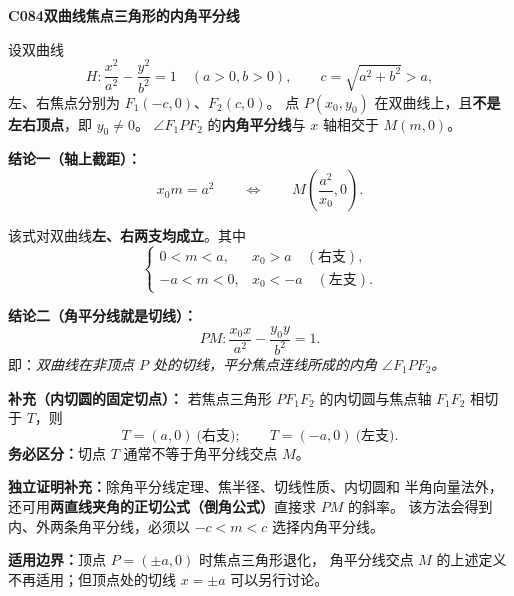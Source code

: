 \begin{statementbox}
\textbf{C084\quad 双曲线焦点三角形的内角平分线}

设双曲线
\[
H:\frac{x^2}{a^2}-\frac{y^2}{b^2}=1\quad(a>0,b>0),
\qquad c=\sqrt{a^2+b^2}>a,
\]
左、右焦点分别为 $F_1(-c,0)$、$F_2(c,0)$。
点 $P(x_0,y_0)$ 在双曲线上，且\textbf{不是左右顶点}，即 $y_0\ne0$。
$\angle F_1PF_2$ 的\textbf{内角平分线}与 $x$ 轴相交于 $M(m,0)$。

\textbf{结论一（轴上截距）：}
\[
\boxed{x_0m=a^2}\qquad\Longleftrightarrow\qquad
\boxed{M\left(\frac{a^2}{x_0},0\right)}.
\]

\end{statementbox}
\clearpage
\begin{statementbox}
该式对双曲线\textbf{左、右两支均成立}。其中
\[
\begin{cases}
0<m<a,&x_0>a\quad(\text{右支}),\\
-a<m<0,&x_0<-a\quad(\text{左支}).
\end{cases}
\]

\textbf{结论二（角平分线就是切线）：}
\[
\boxed{PM:\frac{x_0x}{a^2}-\frac{y_0y}{b^2}=1}.
\]
即：\emph{双曲线在非顶点 $P$ 处的切线，平分焦点连线所成的内角
$\angle F_1PF_2$。}

\textbf{补充（内切圆的固定切点）：}
若焦点三角形 $PF_1F_2$ 的内切圆与焦点轴 $F_1F_2$ 相切于 $T$，则
\[
\boxed{T=(a,0)\ \text{(右支)};
\qquad T=(-a,0)\ \text{(左支)}}.
\]
\textbf{务必区分：}切点 $T$ 通常不等于角平分线交点 $M$。

\textbf{独立证明补充：}除角平分线定理、焦半径、切线性质、内切圆和
半角向量法外，还可用\textbf{两直线夹角的正切公式（倒角公式）}直接求 $PM$ 的斜率。
该方法会得到内、外两条角平分线，必须以 $-c<m<c$ 选择内角平分线。

\textbf{适用边界：}顶点 $P=(\pm a,0)$ 时焦点三角形退化，
角平分线交点 $M$ 的上述定义不再适用；但顶点处的切线
$x=\pm a$ 可以另行讨论。
\end{statementbox}
